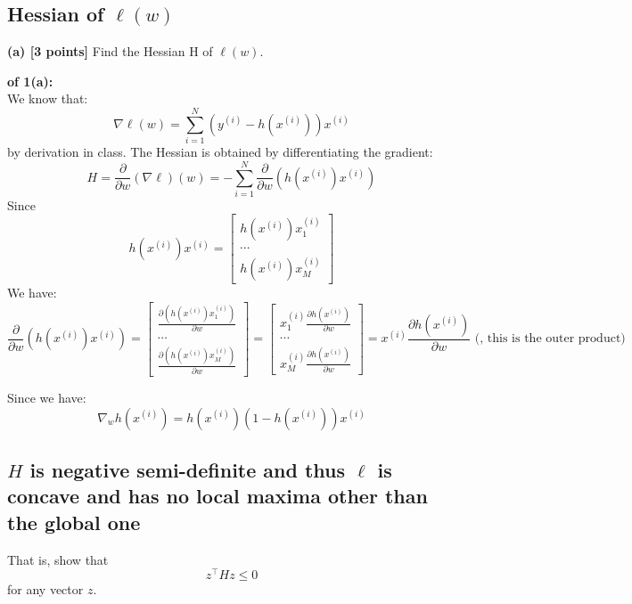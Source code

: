 \documentclass[lang=cn,11pt]{elegantbook}
\begin{document}
\subsection{Hessian of $\ell(w)$}
\textbf{(a) [3 points]} Find the Hessian H of $\ell(w)$.
\begin{solution}
    \textbf{of 1(a):}\\
 We know that: \[
\nabla \ell(w) = \sum_{i=1}^{N} (y^{(i)} - h(x^{(i)})) x^{(i)}
\] by derivation in class.
The Hessian is obtained by differentiating the gradient:
\[
H = \frac{\partial}{\partial w} (\nabla \ell)(w)  = -\sum_{i=1}^{N} \frac{\partial}{\partial w}  ( h(x^{(i)}) x^{(i)})
\]
Since \[
h(x^{(i)}) x^{(i)}  = \begin{bmatrix}
    h(x^{(i)}) x_1^{(i)}\\
    \cdots\\
    h(x^{(i)}) x_M^{(i)}
\end{bmatrix}
\]
We have: \[
\frac{\partial}{\partial w}  ( h(x^{(i)}) x^{(i)}) = \begin{bmatrix}
\frac{\partial(h(x^{(i)}) x_1^{(i)})}{\partial w}\\
    \cdots\\
    \frac{\partial(h(x^{(i)}) x_M^{(i)})}{\partial w}
\end{bmatrix} = \begin{bmatrix}
x_1^{(i)} \frac{\partial h(x^{(i)})}{\partial w}\\
    \cdots\\
    x_M^{(i)} \frac{\partial h(x^{(i)})}{\partial w}
\end{bmatrix} = x^{(i)} \frac{\partial h(x^{(i)})}{\partial w}  \text{ (, this is the outer product)}
\]






Since we have:  \[
 \nabla_w h(x^{(i)}) =h(x^{(i)}) (1 -h(x^{(i)})) x^{(i)}
\]

\end{solution}




\subsection{$H$ is negative semi-definite and thus $\ell$ is concave and has no local maxima other than the global one}

That is, show that
\begin{equation}
    z^\top H z \leq 0
\end{equation}
for any vector $z$. 
\end{document}
